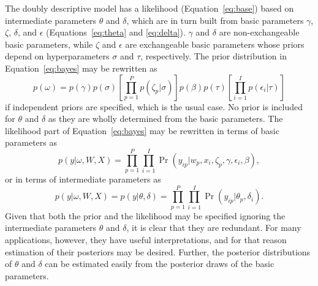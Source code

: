 \documentclass[12pt, letterpaper]{article}
\begin{document}
The doubly descriptive model has a likelihood (Equation~\ref{eq:base}) based on intermediate parameters $\theta$ and $\delta$, which are in turn built from basic parameters $\gamma$, $\zeta$, $\delta$, and $\epsilon$ (Equations~\ref{eq:theta} and \ref{eq:delta}). $\gamma$ and $\delta$ are non-exchangeable basic parameters, while $\zeta$ and $\epsilon$ are exchangeable basic parameters whose priors depend on hyperparameters $\sigma$ and $\tau$, respectively.
The prior distribution in Equation~\ref{eq:bayes} may be rewritten as
\begin{equation} \label{eq:prior}
	p(\omega) =
	p(\gamma) p(\sigma)
	\left [
		\prod_{p=1}^P p(\zeta_p | \sigma)
	\right ]
	p(\beta) p(\tau)
	\left [
		\prod_{i=1}^I p(\epsilon_i | \tau)
	\right ]
\end{equation}
if independent priors are specified, which is the usual case. No prior is included for $\theta$ and $\delta$ as they are wholly determined from the basic parameters.
The likelihood part of Equation~\ref{eq:bayes} may be rewritten in terms of basic parameters as
\begin{equation} \label{eq:bayes-likelihood-alt}
	p(y | \omega, W, X) =
	\prod_{p=1}^P \prod_{i=1}^I
	\Pr(y_{ip} | w_p, x_i, \zeta_p, \gamma, \epsilon_i, \beta)
,\end{equation}
or in terms of intermediate parameters as
\begin{equation} \label{eq:bayes-likelihood}
	p(y | \omega, W, X) =
	p(y | \theta, \delta) =
	\prod_{p=1}^P \prod_{i=1}^I \Pr(y_{ip} | \theta_p, \delta_i)
.\end{equation}
Given that both the prior and the likelihood may be specified ignoring the intermediate parameters $\theta$ and $\delta$, it is clear that they are redundant. For many applications, however, they have useful interpretations, and for that reason estimation of their posteriors may be desired. Further, the posterior distributions of $\theta$ and $\delta$ can be estimated easily from the posterior draws of the basic parameters.
\end{document}
